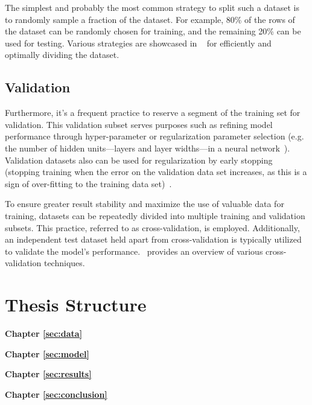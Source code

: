 The simplest and probably the most common strategy to split such a dataset is to randomly sample a fraction of the dataset. For example, 80\% of the rows of the dataset can be randomly chosen for training, and the remaining 20\% can be used for testing. Various strategies are showcased in ~\cite{roshan2022split} for efficiently and optimally dividing the dataset.

\subsection{Validation}
Furthermore, it's a frequent practice to reserve a segment of the training set for validation. This validation subset serves purposes such as refining model performance through hyper-parameter or regularization parameter selection (e.g. the number of hidden units—layers and layer widths—in a neural network~\cite{ripley2007pattern}). Validation datasets also can be used for regularization by early stopping (stopping training when the error on the validation data set increases, as this is a sign of over-fitting to the training data set)~\cite{Prechelt2012}.

To ensure greater result stability and maximize the use of valuable data for training, datasets can be repeatedly divided into multiple training and validation subsets. This practice, referred to as cross-validation, is employed. Additionally, an independent test dataset held apart from cross-validation is typically utilized to validate the model's performance.~\cite{browne2000cv} provides an overview of various cross-validation techniques.

\section{Thesis Structure}
\label{sec:intro:structure}

\textbf{Chapter \ref{sec:data}} \\[0.2em]
\blindtext

\textbf{Chapter \ref{sec:model}} \\[0.2em]
\blindtext

\textbf{Chapter \ref{sec:results}} \\[0.2em]
\blindtext

\textbf{Chapter \ref{sec:conclusion}} \\[0.2em]
\blindtext
